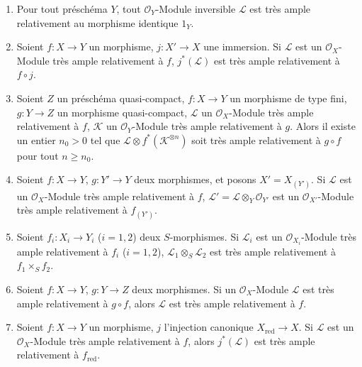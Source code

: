 \begin{proposition}[4.4.10]
\label{II.4.4.10-fr}
\begin{enumerate}
  \item[\rm{(i)}] Pour tout préschéma $Y$, tout $\mathcal{O}_Y$-Module
  inversible $\mathcal{L}$ est très ample relativement au morphisme identique
  $1_Y$.
  \item[\rm{(i bis)}] Soient $f:X\to Y$ un morphisme, $j:X'\to X$ une
  immersion. Si $\mathcal{L}$ est un $\mathcal{O}_X$-Module très ample
  relativement à $f$, $j^*(\mathcal{L})$ est très ample relativement à
  $f\circ j$.
  \item[\rm{(ii)}] Soient $Z$ un préschéma quasi-compact, $f:X\to Y$ un
  morphisme de type fini, $g:Y\to Z$ un morphisme quasi-compact,
  $\mathcal{L}$ un $\mathcal{O}_X$-Module très ample relativement à $f$,
  $\mathcal{K}$ un $\mathcal{O}_Y$-Module très ample relativement à $g$.
  Alors il existe un entier $n_0>0$ tel que
  $\mathcal{L}\otimes f^*(\mathcal{K}^{\otimes n})$ soit très ample
  relativement à $g\circ f$ pour tout $n\geq n_0$.
  \item[\rm{(iii)}] Soient $f:X\to Y$, $g:Y'\to Y$ deux morphismes, et posons
  $X'=X_{(Y')}$. Si $\mathcal{L}$ est un $\mathcal{O}_X$-Module très ample
  relativement à $f$, $\mathcal{L}'=\mathcal{L}\otimes_Y\mathcal{O}_{Y'}$
  est un $\mathcal{O}_{X'}$-Module très ample relativement à $f_{(Y')}$.
  \item[\rm{(iv)}] Soient $f_i:X_i\to Y_i$ ($i=1,2$) deux $S$-morphismes.
  Si $\mathcal{L}_i$ est un $\mathcal{O}_{X_i}$-Module très ample relativement
  à $f_i$ ($i=1,2$), $\mathcal{L}_1\otimes_S\mathcal{L}_2$ est très ample
  relativement à $f_1\times_Sf_2$.
  \item[\rm{(v)}] Soient $f:X\to Y$, $g:Y\to Z$ deux morphismes. Si un
  $\mathcal{O}_X$-Module $\mathcal{L}$ est très ample relativement à
  $g\circ f$, alors $\mathcal{L}$ est très ample relativement à $f$.
  \item[\rm{(vi)}] Soient $f:X\to Y$ un morphisme, $j$ l'injection canonique
  $X_{\mathrm{red}}\to X$. Si $\mathcal{L}$ est un $\mathcal{O}_X$-Module
  très ample relativement à $f$, alors $j^*(\mathcal{L})$ est très ample
  relativement à $f_{\mathrm{red}}$.
\end{enumerate}
\end{proposition}

